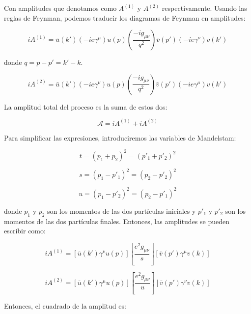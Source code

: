 Con amplitudes que denotamos como $ A^{(1)} $ y $ A^{(2)} $ respectivamente. Usando las reglas de Feynman, podemos traducir los diagramas de Feynman en amplitudes:

\begin{equation}
iA^{(1)} = \bar{u}(k')(-ie\gamma^\mu)u(p) \left( \frac{-ig_{\mu\nu}}{q^2} \right) \bar{v}(p')(-ie\gamma^\nu)v(k')
\end{equation}

donde $ q = p - p' = k' - k $.

\begin{equation}
iA^{(2)} = \bar{u}(k')(-ie\gamma^\nu)u(p) \left( \frac{-ig_{\mu\nu}}{q^2} \right) \bar{v}(p')(-ie\gamma^\mu)v(k')
\end{equation}

La amplitud total del proceso es la suma de estos dos:

\begin{equation}
\mathcal{A} = iA^{(1)} + iA^{(2)} 
\end{equation}

Para simplificar las expresiones, introduciremos las variables de Mandelstam:

\begin{equation}
t = (p_1 + p_2)^2 = (p'_1 + p'_2)^2
\end{equation}

\begin{equation}
s = (p_1 - p'_1)^2 = (p_2 - p'_2)^2
\end{equation}

\begin{equation}
u = (p_1 - p'_2)^2 = (p_2 - p'_1)^2
\end{equation}

donde $ p_1 $ y $ p_2 $ son los momentos de las dos partículas iniciales y $ p'_1 $ y $ p'_2 $ son los momentos de las dos partículas finales. Entonces, las amplitudes se pueden escribir como:

\begin{equation}
iA^{(1)} = \left[ \bar{u}(k')\gamma^\nu u(p) \right] \left[ \frac{e^2 g_{\mu\nu}}{s} \right] \left[ \bar{v}(p')\gamma^\mu v(k) \right]
\end{equation}

\begin{equation}
iA^{(2)} = \left[ \bar{u}(k')\gamma^\mu u(p) \right] \left[ \frac{e^2 g_{\mu\nu}}{u} \right] \left[ \bar{v}(p')\gamma^\nu v(k) \right]
\end{equation}

Entonces, el cuadrado de la amplitud es:

